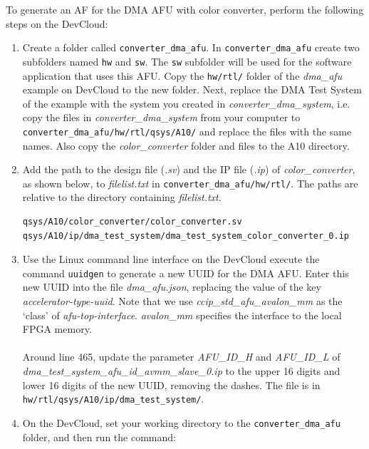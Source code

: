 \documentclass[11pt, twoside, pdftex]{article}
\begin{document}
\noindent
To generate an AF for the DMA AFU with color converter, perform the following steps on the DevCloud:
\begin{enumerate}
    \item Create a folder called \texttt{converter\_dma\_afu}. In \texttt{converter\_dma\_afu} create two subfolders named \texttt{hw} and \texttt{sw}. The \texttt{sw} subfolder will be used for the software application that uses this AFU. Copy the \texttt{hw/rtl/} folder of the {\it dma\_afu} example on DevCloud to the new folder. Next, replace the DMA Test System of the example with the system you created in {\it converter\_dma\_system}, i.e. copy the files in {\it converter\_dma\_system} from your computer to \texttt{converter\_dma\_afu/hw/rtl/qsys/A10/} and replace the files with the same names. Also copy the {\it color\_converter} folder and files to the A10 directory.
    
    \item Add the path to the design file ({\it .sv}) and the IP file ({\it .ip}) of {\it color\_converter}, as shown below,  to {\it filelist.txt} in \texttt{converter\_dma\_afu/hw/rtl/}. The paths are relative to the directory containing {\it filelist.txt}.
    
\lstset{language=C,numbers=none,escapechar=|}
\begin{lstlisting}[name=filelist]
qsys/A10/color_converter/color_converter.sv
qsys/A10/ip/dma_test_system/dma_test_system_color_converter_0.ip
\end{lstlisting}

    \item Use the Linux command line interface on the DevCloud execute the command 
\texttt{uuidgen} to generate a new UUID for the DMA AFU.
Enter this new UUID into the file {\it dma\_afu.json}, replacing the value of the key {\it accelerator-type-uuid}. Note that we use {\it ccip\_std\_afu\_avalon\_mm} as the `class' of {\it afu-top-interface}. {\it avalon\_mm} specifies the interface to the local FPGA memory.\\
\\
Around line 465, update the parameter {\it AFU\_ID\_H}  and {\it AFU\_ID\_L} of {\it dma\_test\_system\_afu\_id\_avmm\_slave\_0.ip} to the upper 16 digits and lower 16 digits of the new UUID, removing the dashes. The file is in\\ \texttt{hw/rtl/qsys/A10/ip/dma\_test\_system/}.

    \item  On the DevCloud, set your working directory to the \texttt{converter\_dma\_afu} folder, and then run the command: 


\end{enumerate}
\end{document}
